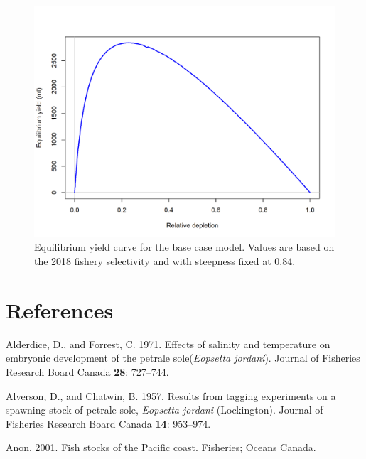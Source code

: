 \documentclass[12pt,]{article}
\begin{document}
\FloatBarrier

\begin{figure}
\centering
\includegraphics{r4ss/plots_mod1/yield1_yield_curve.png}
\caption{Equilibrium yield curve for the base case model. Values are
based on the 2018 fishery selectivity and with steepness fixed at 0.84.
\label{fig:yield}}
\end{figure}

\FloatBarrier

\newpage

\color{black}

\section{References}\label{references}

\renewcommand{\thepage}{}

\hypertarget{refs}{}
\hypertarget{ref-alderdice_effects_1971}{}
Alderdice, D., and Forrest, C. 1971. Effects of salinity and temperature
on embryonic development of the petrale sole(\emph{Eopsetta jordani}).
Journal of Fisheries Research Board Canada \textbf{28}: 727--744.

\hypertarget{ref-alverson_results_1957}{}
Alverson, D., and Chatwin, B. 1957. Results from tagging experiments on
a spawning stock of petrale sole, \emph{Eopsetta jordani} (Lockington).
Journal of Fisheries Research Board Canada \textbf{14}: 953--974.

\hypertarget{ref-anon_fish_2001}{}
Anon. 2001. Fish stocks of the Pacific coast. Fisheries; Oceans Canada.
\end{document}
